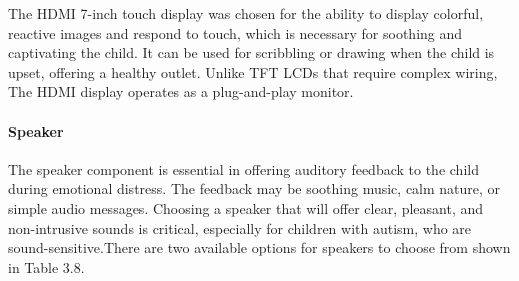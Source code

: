 \documentclass[a4paper,12pt]{report}
\begin{document}
The HDMI 7-inch touch display was chosen for the ability to display colorful, reactive images and respond to touch,  which is necessary for soothing and captivating the child.  It can be used for scribbling or drawing when the child is upset, offering a healthy outlet. Unlike TFT LCDs that require complex wiring, The HDMI display operates as a plug-and-play monitor.

\paragraph{Speaker \\[0.3cm]}
The speaker component is essential in offering auditory feedback to the child during emotional distress. The feedback may be soothing music, calm nature, or simple audio messages. Choosing a speaker that will offer clear, pleasant, and non-intrusive sounds is critical, especially for children with autism, who are sound-sensitive.There are two available options for speakers to choose from shown in Table 3.8. \\[0.1cm]

\clearpage
\renewcommand{\arraystretch}{1.8} %
\end{document}
